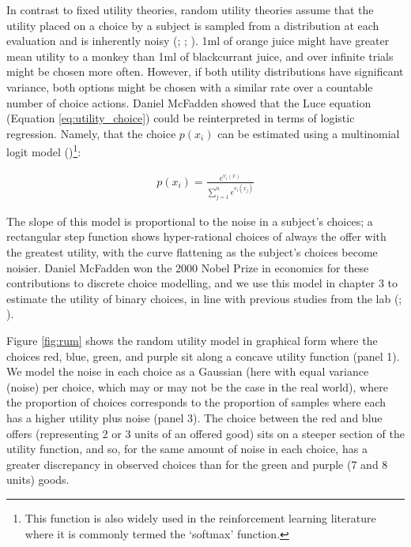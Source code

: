In contrast to fixed utility theories, random utility theories assume that the utility placed on a choice by a subject is sampled from a distribution at each evaluation and is inherently noisy (\cite{beckerMeasuringUtilitySingleresponse1964}; \cite{marschakBinaryChoiceConstraints1960}; \cite{mcfaddenEconometricModelsProbabilistic1982}). 1ml of orange juice might have greater mean utility to a monkey than 1ml of blackcurrant juice, and over infinite trials might be chosen more often. However, if both utility distributions have significant variance, both options might be chosen with a similar rate over a countable number of choice actions. Daniel McFadden showed that the Luce equation (Equation \ref{eq:utility_choice}) could be reinterpreted in terms of logistic regression. Namely, that the choice $p(x_i)$ can be estimated using a multinomial logit model (\cite{mcfaddenMixedMNLModels2000})\footnote{This function is also widely used in the reinforcement learning literature where it is commonly termed the `softmax' function.}:

\begin{align}
p(x_i) = \frac{e^{v_i(x)}}{\sum_{j=1}^{n} e^{v_i(x_j)}}
\label{eq:rum_choice}
\end{align}

The slope of this model is proportional to the noise in a subject's choices; a rectangular step function shows hyper-rational choices of always the offer with the greatest utility, with the curve flattening as the subject's choices become noisier. Daniel McFadden won the 2000 Nobel Prize in economics for these contributions to discrete choice modelling, and we use this model in chapter 3 to estimate the utility of binary choices, in line with previous studies from the lab (\cite{ferraritonioloNonhumanPrimatesSatisfy2021}; \cite{pastorMonkeysChooseIf2017}).

Figure \ref{fig:rum} shows the random utility model in graphical form where the choices red, blue, green, and purple sit along a concave utility function (panel 1). We model the noise in each choice as a Gaussian (here with equal variance (noise) per choice, which may or may not be the case in the real world), where the proportion of choices corresponds to the proportion of samples where each has a higher utility plus noise (panel 3). The choice between the red and blue offers (representing 2 or 3 units of an offered good) sits on a steeper section of the utility function, and so, for the same amount of noise in each choice, has a greater discrepancy in observed choices than for the green and purple (7 and 8 units) goods.


